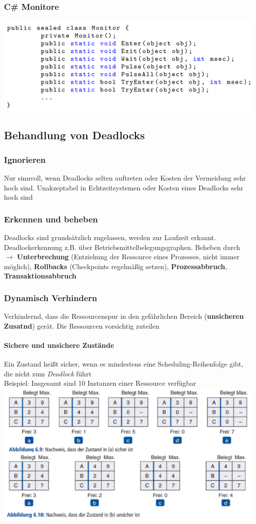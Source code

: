 \documentclass[10pt,a4paper,landscape]{article}
\begin{document}
\begin{multicols*}{3}
	\subsubsection{C\# Monitore}
	\includegraphics[width=0.65\columnwidth]{monitor_csharp}
	\subsection{Behandlung von Deadlocks}
	\subsubsection{Ignorieren}
	Nur sinnvoll, wenn Deadlocks selten auftreten oder Kosten der Vermeidung sehr hoch sind. Unakzeptabel in Echtzeitsystemen oder Kosten eines Deadlocks sehr hoch sind
	\subsubsection{Erkennen und beheben}
	Deadlocks sind grundsätzlich zugelassen, werden zur Laufzeit erkannt. Deadlockerkennung z.B. über Betriebsmittelbelegungsgraphen. Beheben durch $\rightarrow$ \textbf{Unterbrechung} (Entziehung der Ressource eines Prozesses, nicht immer möglich), \textbf{Rollbacks} (Checkpoints regelmäßig setzen), \textbf{Prozessabbruch}, \textbf{Transaktionsabbruch}
	\subsubsection{Dynamisch Verhindern}
	Verhindernd, dass die Ressourcenspur in den gefährlichen Bereich (\textbf{unsicheren Zusatnd}) gerät. Die Ressourcen vorsichtig zuteilen
	\paragraph{Sichere und unsichere Zustände} Ein Zustand heißt sicher, wenn es mindestens eine Scheduling-Reihenfolge gibt, die nicht zum \textit{Deadlock} führt\\
	Beispiel: Insgesamt sind 10 Instanzen einer Ressource verfügbar\\
	\includegraphics[width=0.98\columnwidth]{zustand}

\end{multicols*}
\end{document}

